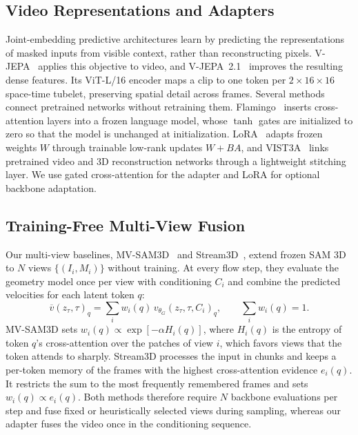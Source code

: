 \documentclass{article}
\begin{document}
\subsection{Video Representations and Adapters}
Joint-embedding predictive architectures learn by predicting the representations of masked inputs from visible context, rather than reconstructing pixels. V-JEPA~\cite{vjepa} applies this objective to video, and V-JEPA~2.1~\cite{vjepa21} improves the resulting dense features. Its ViT-L/16 encoder maps a clip to one token per $2\times16\times16$ space-time tubelet, preserving spatial detail across frames. Several methods connect pretrained networks without retraining them. Flamingo~\cite{flamingo} inserts cross-attention layers into a frozen language model, whose $\tanh$ gates are initialized to zero so that the model is unchanged at initialization. LoRA~\cite{lora} adapts frozen weights $W$ through trainable low-rank updates $W+BA$, and VIST3A~\cite{vist3a} links pretrained video and 3D reconstruction networks through a lightweight stitching layer. We use gated cross-attention for the adapter and LoRA for optional backbone adaptation.

\subsection{Training-Free Multi-View Fusion}
Our multi-view baselines, MV-SAM3D~\cite{mvsam3d} and Stream3D~\cite{stream3d}, extend frozen SAM 3D to $N$ views $\{(I_i,M_i)\}$ without training. At every flow step, they evaluate the geometry model once per view with conditioning $C_i$ and combine the predicted velocities for each latent token $q$:
\begin{equation}
\overline{v}(z_\tau,\tau)_q=\sum_{i} w_i(q)\,v_{\theta_G}(z_\tau,\tau,C_i)_q,
\qquad \sum_i w_i(q)=1.
\label{eq:mvfuse}
\end{equation}
MV-SAM3D sets $w_i(q)\propto\exp[-\alpha H_i(q)]$, where $H_i(q)$ is the entropy of token $q$'s cross-attention over the patches of view $i$, which favors views that the token attends to sharply. Stream3D processes the input in chunks and keeps a per-token memory of the frames with the highest cross-attention evidence $e_i(q)$. It restricts the sum to the most frequently remembered frames and sets $w_i(q)\propto e_i(q)$. Both methods therefore require $N$ backbone evaluations per step and fuse fixed or heuristically selected views during sampling, whereas our adapter fuses the video once in the conditioning sequence.
\end{document}
